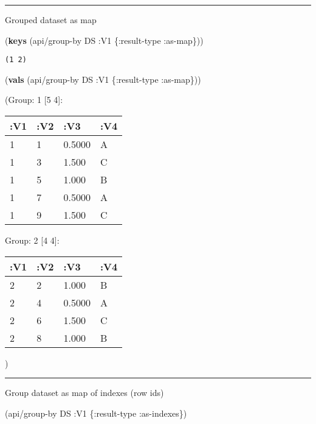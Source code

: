 \documentclass[]{article}
\newenvironment{Shaded}{\begin{snugshade}}{\end{snugshade}}
\newcommand{\KeywordTok}[1]{\textcolor[rgb]{0.13,0.29,0.53}{\textbf{#1}}}
\newcommand{\AttributeTok}[1]{\textcolor[rgb]{0.77,0.63,0.00}{#1}}
\newcommand{\NormalTok}[1]{#1}
\begin{document}
\begin{center}\rule{0.5\linewidth}{0.5pt}\end{center}

Grouped dataset as map

\begin{Shaded}
\begin{Highlighting}[]
\NormalTok{(}\KeywordTok{keys}\NormalTok{ (api/group-by DS }\AttributeTok{:V1}\NormalTok{ \{}\AttributeTok{:result-type} \AttributeTok{:as-map}\NormalTok{\}))}
\end{Highlighting}
\end{Shaded}

\begin{verbatim}
(1 2)
\end{verbatim}

\begin{Shaded}
\begin{Highlighting}[]
\NormalTok{(}\KeywordTok{vals}\NormalTok{ (api/group-by DS }\AttributeTok{:V1}\NormalTok{ \{}\AttributeTok{:result-type} \AttributeTok{:as-map}\NormalTok{\}))}
\end{Highlighting}
\end{Shaded}

(Group: 1 {[}5 4{]}:

\begin{longtable}[]{@{}llll@{}}
\toprule
:V1 & :V2 & :V3 & :V4\tabularnewline
\midrule
\endhead
1 & 1 & 0.5000 & A\tabularnewline
1 & 3 & 1.500 & C\tabularnewline
1 & 5 & 1.000 & B\tabularnewline
1 & 7 & 0.5000 & A\tabularnewline
1 & 9 & 1.500 & C\tabularnewline
\bottomrule
\end{longtable}

Group: 2 {[}4 4{]}:

\begin{longtable}[]{@{}llll@{}}
\toprule
:V1 & :V2 & :V3 & :V4\tabularnewline
\midrule
\endhead
2 & 2 & 1.000 & B\tabularnewline
2 & 4 & 0.5000 & A\tabularnewline
2 & 6 & 1.500 & C\tabularnewline
2 & 8 & 1.000 & B\tabularnewline
\bottomrule
\end{longtable}

)

\begin{center}\rule{0.5\linewidth}{0.5pt}\end{center}

Group dataset as map of indexes (row ids)

\begin{Shaded}
\begin{Highlighting}[]
\NormalTok{(api/group-by DS }\AttributeTok{:V1}\NormalTok{ \{}\AttributeTok{:result-type} \AttributeTok{:as-indexes}\NormalTok{\})}
\end{Highlighting}
\end{Shaded}
\end{document}

